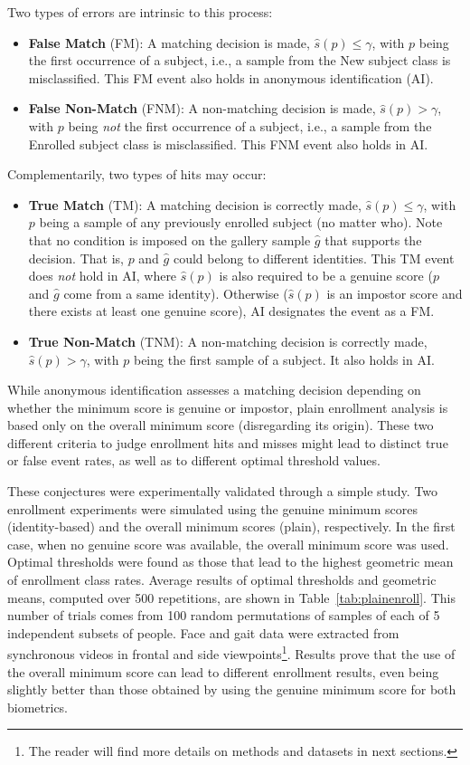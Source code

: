 \documentclass{llncs}
\begin{document}
Two types of errors are intrinsic to this process:
\begin{itemize}
\item \textbf{False Match} (FM): A matching decision is made, $\hat s(p)\le\gamma$, with $p$ being the first occurrence of a subject, i.e., a sample from the New subject class is misclassified. This FM event also holds in anonymous identification (AI).
\item \textbf{False Non-Match} (FNM): A non-matching decision is made, $\hat s(p)>\gamma$, with $p$ being \emph{not} the first occurrence of a subject, i.e., a sample from the Enrolled subject class is misclassified. This FNM event also holds in AI.
\end{itemize}

Complementarily, two types of hits may occur:
\begin{itemize}
\item \textbf{True Match} (TM): A matching decision is correctly made, $\hat s(p)\le\gamma$, with $p$ being a sample of any previously enrolled subject (no matter who). Note that no condition is imposed on the gallery sample $\hat g$ that supports the decision. That is, $p$ and $\hat g$ could belong to different identities. This TM event does \emph{not} hold in AI, where $\hat s(p)$ is also required to be a genuine score ($p$ and $\hat g$ come from a same identity). Otherwise ($\hat s(p)$ is an impostor score and there exists at least one genuine score), AI designates the event as a FM.
\item \textbf{True Non-Match} (TNM): A non-matching decision is correctly made, $\hat s(p)>\gamma$, with $p$ being the first sample of a subject. It also holds in AI.
\end{itemize}

While anonymous identification assesses a matching decision depending on whether the minimum score is genuine or impostor, plain enrollment analysis is based only on the overall minimum score (disregarding its origin). These two different criteria to judge enrollment hits and misses might lead to distinct true or false event rates, as well as to different optimal threshold values. 

These conjectures were experimentally validated through a simple study. Two enrollment experiments were simulated using the genuine minimum scores (identity-based) and the overall minimum scores (plain), respectively. In the first case, when no genuine score was available, the overall minimum score was used. Optimal thresholds were found as those that lead to the highest geometric mean of enrollment class rates. Average results of optimal thresholds and geometric means, computed over 500 repetitions, are shown in Table~\ref{tab:plainenroll}. This number of trials comes from 100 random permutations of samples of each of 5 independent subsets of people. Face and gait data were extracted from synchronous videos in frontal and side viewpoints\footnote{The reader will find more details on methods and datasets in next sections.}. Results prove that the use of the overall minimum score can lead to different enrollment results, even being slightly better than those obtained by using the genuine minimum score for both biometrics.
\end{document}
